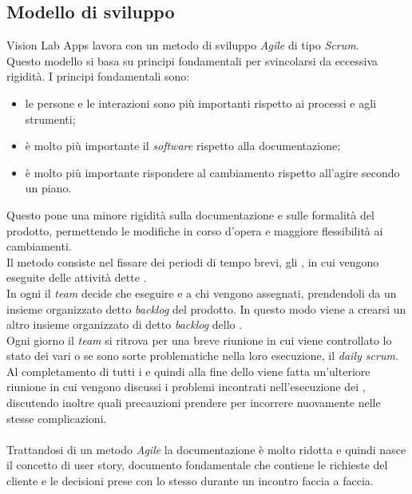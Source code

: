     \subsection{Modello di sviluppo}
      Vision Lab Apps lavora con un metodo di sviluppo \textit{Agile} di tipo \textit{Scrum}.\\
      Questo modello si basa su principi fondamentali per svincolarsi da eccessiva rigidità. I principi fondamentali sono:
      \begin{itemize}
        \item le persone e le interazioni sono più importanti rispetto ai processi e agli strumenti;
        \item è molto più importante il \textit{software} rispetto alla documentazione;
        \item è molto più importante rispondere al cambiamento rispetto all'agire secondo un piano.
      \end{itemize}
      Questo pone una minore rigidità sulla documentazione e sulle formalità del prodotto, permettendo le modifiche in corso d'opera e maggiore flessibilità ai cambiamenti.\\
      Il metodo consiste nel fissare dei periodi di tempo brevi, gli , in cui vengono eseguite delle attività dette .\\
      In ogni  il \textit{team} decide che  eseguire e a chi vengono assegnati, prendendoli da un insieme organizzato detto \textit{backlog} del prodotto. In questo modo viene a crearsi un altro insieme organizzato di  detto \textit{backlog} dello .\\
      Ogni giorno il \textit{team} si ritrova per una breve riunione in cui viene controllato lo stato dei vari  o se sono sorte problematiche nella loro esecuzione, il \textit{daily scrum}.\\
      Al completamento di tutti i  e quindi alla fine dello  viene fatta un'ulteriore riunione in cui vengono discussi i problemi incontrati nell'esecuzione dei , discutendo inoltre quali precauzioni prendere per incorrere nuovamente nelle stesse complicazioni.\\\\
      Trattandosi di un metodo \textit{Agile} la documentazione è molto ridotta e quindi nasce il concetto di user story, documento fondamentale che contiene le richieste del cliente e le decisioni prese con lo stesso durante un incontro faccia a faccia.\\
